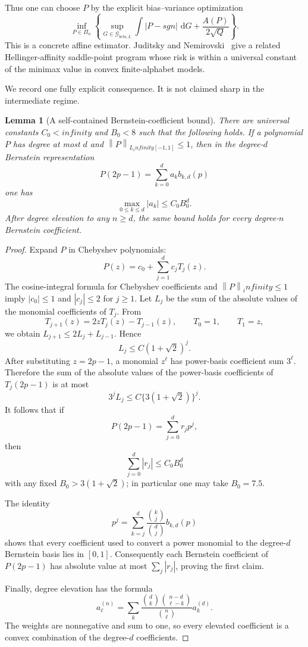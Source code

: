 \documentclass[11pt]{article}
\def\beta{beta}%
\def\sgn{sgn}%
\def\infty{infinity}%
\newtheorem{lemma}[theorem]{Lemma}
\newcommand{\sgn}{\operatorname{sgn}}
\newcommand{\calG}{\mathcal G}
\newcommand{\norm}[1]{\left\lVert#1\right\rVert}
\newcommand{\dd}{\,\mathrm d}
\begin{document}
Thus one can choose $P$ by the explicit bias--variance optimization
\begin{equation}
\label{eq:affine-program}
\inf_{P\in\Pi_n}
\left\{
\sup_{G\in\calG_{\beta,L}}
\int|P-\sgn|\,\dd G
+
\frac{A(P)}{2\sqrt Q}
\right\}.
\end{equation}
This is a concrete affine estimator.  Juditsky and Nemirovski~\cite{JuditskyNemirovski} give a related Hellinger-affinity saddle-point program whose risk is within a universal constant of the minimax value in convex finite-alphabet models.

We record one fully explicit consequence.  It is not claimed sharp in the intermediate regime.

\begin{lemma}[A self-contained Bernstein-coefficient bound]
\label{lem:bernstein-coeff}
There are universal constants $C_0<\infty$ and $B_0<8$ such that the following holds.  If a polynomial $P$ has degree at most $d$ and
$\norm{P}_{L_\infty[-1,1]}\le1$, then in the degree-$d$ Bernstein representation
\[
P(2p-1)=\sum_{k=0}^{d}a_k b_{k,d}(p)
\]
one has
\[
\max_{0\le k\le d}|a_k|
\le C_0B_0^d.
\]
After degree elevation to any $n\ge d$, the same bound holds for every degree-$n$ Bernstein coefficient.
\end{lemma}

\begin{proof}
Expand $P$ in Chebyshev polynomials:
\[
P(z)=c_0+\sum_{j=1}^{d}c_jT_j(z).
\]
The cosine-integral formula for Chebyshev coefficients and
$\norm P_\infty\le1$ imply $|c_0|\le1$ and $|c_j|\le2$ for $j\ge1$.
Let $L_j$ be the sum of the absolute values of the monomial coefficients of $T_j$.  From
\[
T_{j+1}(z)=2zT_j(z)-T_{j-1}(z),
\qquad T_0=1,
\qquad T_1=z,
\]
we obtain $L_{j+1}\le2L_j+L_{j-1}$.  Hence
\[
L_j\le C(1+\sqrt2)^j.
\]
After substituting $z=2p-1$, a monomial $z^\ell$ has power-basis coefficient sum $3^\ell$.  Therefore the sum of the absolute values of the power-basis coefficients of $T_j(2p-1)$ is at most
\[
3^jL_j\le C\{3(1+\sqrt2)\}^j.
\]
It follows that if
\[
P(2p-1)=\sum_{j=0}^{d}r_jp^j,
\]
then
\[
\sum_{j=0}^{d}|r_j|
\le C_0B_0^d
\]
with any fixed $B_0>3(1+\sqrt2)$; in particular one may take $B_0=7.5$.

The identity
\begin{equation}
\label{eq:power-to-bernstein}
p^j
=
\sum_{k=j}^{d}
\frac{\binom{k}{j}}{\binom{d}{j}}b_{k,d}(p)
\end{equation}
shows that every coefficient used to convert a power monomial to the degree-$d$ Bernstein basis lies in $[0,1]$.  Consequently each Bernstein coefficient of $P(2p-1)$ has absolute value at most
$\sum_j|r_j|$, proving the first claim.

Finally, degree elevation has the formula
\[
a^{(n)}_\ell
=
\sum_k
\frac{\binom dk\binom{n-d}{\ell-k}}{\binom n\ell}
a^{(d)}_k.
\]
The weights are nonnegative and sum to one, so every elevated coefficient is a convex combination of the degree-$d$ coefficients.
\end{proof}
\end{document}
